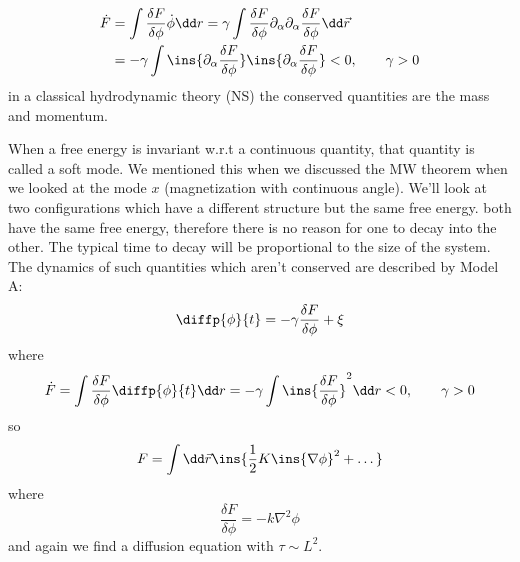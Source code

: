 \begin{description}
\begin{align}
		\dot F &= \int\frac{\delta F}{\delta \phi}\dot\phi\dd r = \gamma\int\frac{\delta F}{\delta \phi}\partial_\alpha\partial_\alpha\frac{\delta F}{\delta\phi}\dd \vec{r}\\
		&= -\gamma\int\ins{\partial_\alpha\frac{\delta F}{\delta\phi}}\ins{\partial_\alpha\frac{\delta F}{\delta\phi}}<0, \qquad \gamma > 0
	\end{align}
	in a classical hydrodynamic theory (NS) the conserved quantities are the mass and momentum.
	\item[Soft/Goldstone Mode] When a free energy is invariant w.r.t a continuous quantity, that quantity is called a soft mode. We mentioned this when we discussed the MW theorem when we looked at the mode $x$ (magnetization with continuous angle). We'll look at two configurations which have a different structure but the same free energy. both have the same free energy, therefore there is no reason for one to decay into the other. The typical time to decay will be proportional to the size of the system. The dynamics of such quantities which aren't conserved are described by Model A:
	\begin{equation}
		\diffp{\phi}{t} = -\gamma\frac{\delta F}{\delta \phi}+\xi
	\end{equation}
	where
	\begin{equation}
		\dot F = \int\frac{\delta F}{\delta \phi}\diffp{\phi}{t}\dd r = -\gamma\int\ins{\frac{\delta F}{\delta \phi}}^2\dd r < 0, \qquad \gamma > 0
	\end{equation}
	so
	\begin{equation}
		F = \int\dd \vec{r}\ins{\frac{1}{2}K\ins{\nabla\phi}^2+\dots}
	\end{equation}
	where
	\begin{equation}
		\frac{\delta F}{\delta\phi} = -k\nabla^2\phi
	\end{equation}
	and again we find a diffusion equation with $\tau\sim L^2$.
\end{description}
